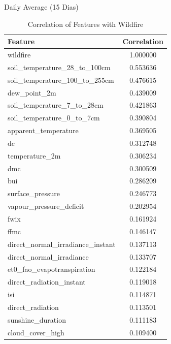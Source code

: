 Daily Average (15 Dias)
\begin{table}[H]
	\caption{Correlation of Features with Wildfire}
	\centering
	\label{wildfire_correlation}
	\begin{tabular}{lc}
		\hline
		Feature                                   & Correlation \\ \hline
		wildfire                                  & 1.000000    \\ 
		soil\_temperature\_28\_to\_100cm        & 0.553636    \\ 
		soil\_temperature\_100\_to\_255cm       & 0.476615    \\ 
		dew\_point\_2m                        & 0.439009    \\ 
		soil\_temperature\_7\_to\_28cm          & 0.421863    \\ 
		soil\_temperature\_0\_to\_7cm           & 0.390804    \\ 
		apparent\_temperature                & 0.369505    \\ 
		dc                                         & 0.312748    \\ 
		temperature\_2m                      & 0.306234    \\ 
		dmc                                        & 0.300509    \\ 
		bui                                        & 0.286209    \\ 
		surface\_pressure                    & 0.246773    \\ 
		vapour\_pressure\_deficit             & 0.202954    \\ 
		fwix                                       & 0.161924    \\ 
		ffmc                                       & 0.146147    \\ 
		direct\_normal\_irradiance\_instant    & 0.137113    \\ 
		direct\_normal\_irradiance            & 0.133707    \\ 
		et0\_fao\_evapotranspiration          & 0.122184    \\ 
		direct\_radiation\_instant            & 0.119018    \\ 
		isi                                        & 0.114871    \\ 
		direct\_radiation                    & 0.113501    \\ 
		sunshine\_duration                   & 0.111183    \\ 
		cloud\_cover\_high                    & 0.109400    \\ 

\end{tabular}
\end{table}
